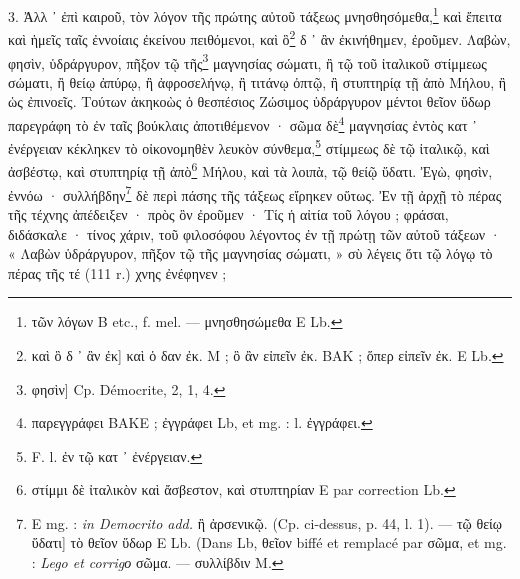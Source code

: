 \documentclass[a4paper, 11pt, oneside, polutonikogreek, french]{article}
\begin{document}
3. Ἀλλ ᾽ ἐπὶ καιροῦ, τὸν λόγον τῆς πρώτης αὐτοῦ τάξεως μνησθησόμεθα,\footnote{τῶν λόγων B etc., f. mel. --- μνησθησώμεθα E Lb.} καὶ ἔπειτα καὶ ἡμεῖς ταῖς ἐννοίαις ἐκείνου πειθόμενοι, καὶ ὃ\footnote{καὶ ὃ δ ᾽ ἂν ἐκ] καὶ ὁ δαν ἐκ. M ; ὃ ἂν εἰπεῖν ἐκ. BAK ; ὅπερ εἰπεῖν ἐκ. E Lb.} δ ᾽ ἂν ἐκινήθημεν, ἐροῦμεν. Λαβὼν, φησὶν, ὑδράργυρον, πῆξον τῷ τῆς\footnote{φησὶν] Cp. Démocrite, 2, 1, 4.} μαγνησίας σώματι, ἢ τῷ τοῦ ἰταλικοῦ στίμμεως σώματι, ἢ θείῳ ἀπύρῳ, ἢ ἀφροσελήνῳ, ἢ τιτάνῳ ὀπτῷ, ἢ στυπτηρίᾳ τῇ ἀπὸ Μήλου, ἢ ὡς ἐπινοεῖς. Τούτων ἀκηκοὼς ὁ θεσπέσιος Ζώσιμος ὑδράργυρον μέντοι θεῖον ὕδωρ παρεγράφη τὸ ἐν ταῖς βούκλαις ἀποτιθέμενον · σῶμα δὲ\footnote{παρεγγράφει BAKE ; ἐγγράφει Lb, et mg. : l. ἐγγράφει.} μαγνησίας ἐντὸς κατ ᾽ ἐνέργειαν κέκληκεν τὸ οἰκονομηθὲν λευκὸν σύνθεμα,\footnote{F. l. ἐν τῷ κατ ᾽ ἐνέργειαν.} στίμμεως δὲ τῷ ἰταλικῷ, καὶ ἀσβέστῳ, καὶ στυπτηρίᾳ τῇ ἀπὸ\footnote{στίμμι δὲ ἰταλικὸν καὶ ἄσβεστον, καὶ στυπτηρίαν E par correction Lb.} Μήλου, καὶ τὰ λοιπὰ, τῷ θείῷ ὕδατι. Ἐγὼ, φησὶν, ἐννόω · συλλήβδην\footnote{E mg. : \emph{in Democrito add.} ἢ ἀρσενικῷ. (Cp. ci-dessus, p. 44, l. 1). --- τῷ θείῳ ὕδατι] τὸ θεῖον ὕδωρ E Lb. (Dans Lb, θεῖον biffé et remplacé par σῶμα, et mg. : \emph{Lego et corrigο} σῶμα. --- συλλίβδιν M.} δὲ περὶ πάσης τῆς τάξεως εἴρηκεν οὕτως. Ἐν τῇ ἀρχῇ τὸ πέρας τῆς τέχνης ἀπέδειξεν · πρὸς ὃν ἐροῦμεν · Τίς ἡ αἰτία τοῦ λόγου ; φράσαι, διδάσκαλε · τίνος χάριν, τοῦ φιλοσόφου λέγοντος ἐν τῇ πρώτῃ τῶν αὐτοῦ τάξεων · « Λαβὼν ὑδράργυρον, πῆξον τῷ τῆς μαγνησίας σώματι, » σὺ λέγεις ὅτι τῷ λόγῳ τὸ πέρας τῆς τέ (111 r.) χνης ἐνέφηνεν ;
\end{document}
